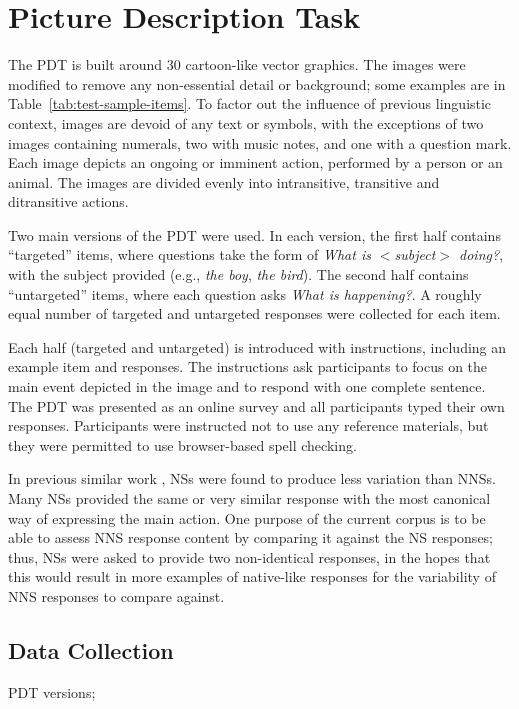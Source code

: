 \documentclass[11pt,a4paper]{article}
\begin{document}
\section{Picture Description Task}

The PDT is built around 30 cartoon-like vector graphics. The images were modified to remove any non-essential detail or background; some examples are in Table~\ref{tab:test-sample-items}. To factor out the influence of previous linguistic context, images are devoid of any text or symbols, with the exceptions of two images containing numerals, two with music notes, and one with a question mark. Each image depicts an ongoing or imminent action, performed by a person or an animal. The images are divided evenly into intransitive, transitive and ditransitive actions. 

Two main versions of the PDT were used. In each version, the first half contains ``targeted'' items, where questions take the form of \textit{What is $<$subject$>$ doing?}, with the subject provided (e.g., \textit{the boy}, \textit{the bird}). The second half contains ``untargeted'' items, where each question asks \textit{What is happening?}. A roughly equal number of targeted and untargeted responses were collected for each item.

Each half (targeted and untargeted) is introduced with instructions, including an example item and responses. The instructions ask participants to focus on the main event depicted in the image and to respond with one complete sentence. The PDT was presented as an online survey and all participants typed their own responses. Participants were instructed not to use any reference materials, but they were permitted to use browser-based spell checking.

In previous similar work \citep{king:dickinson:13,king:dickinson:16}, NSs were found to produce less variation than NNSs. Many NSs provided the same or very similar response with the most canonical way of expressing the main action. One purpose of the current corpus is to be able to assess NNS response content by comparing it against the NS responses; thus, NSs were asked to provide two non-identical responses, in the hopes that this would result in more examples of native-like responses for the variability of NNS responses to compare against.

\subsection{Data Collection}
PDT versions;
\end{document}
